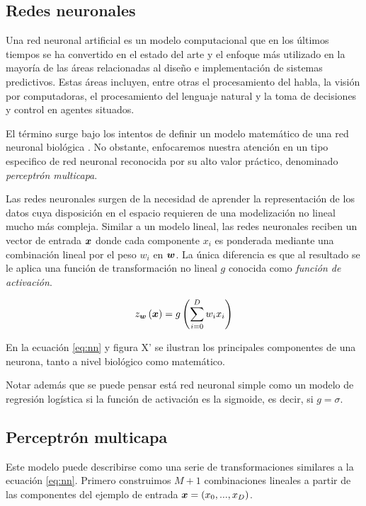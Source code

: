 \subsection{Redes neuronales}

Una red neuronal artificial es un modelo computacional que en los últimos
tiempos se ha convertido en el estado del arte y el enfoque más utilizado en la
mayoría de las áreas relacionadas al diseño e implementación de sistemas
predictivos. Estas áreas incluyen, entre otras el procesamiento del habla, la
visión por computadoras, el procesamiento del lenguaje natural y la toma de
decisiones y control en agentes situados.

El término surge bajo los intentos de definir un modelo matemático de una red
neuronal biológica \citep{McCulloch-Pitts-1990}. No obstante, enfocaremos nuestra atención en un tipo
especifico de red neuronal reconocida por su alto valor práctico, denominado
\emph{perceptrón multicapa}.

Las redes neuronales surgen de la necesidad de aprender la representación de los
datos cuya disposición en el espacio requieren de una modelización no lineal
mucho más compleja. Similar a un modelo lineal, las redes neuronales reciben un
vector de entrada $\boldsymbol{x}$ donde cada componente $x_i$ es ponderada mediante
una combinación lineal por el peso $w_i$ en $\boldsymbol{w}$. La única diferencia es que
al resultado se le aplica una función de transformación no lineal $g$ conocida
como \emph{función de activación}.

\begin{equation} \label{eq:nn}
    z_{\boldsymbol{w}}\left( \boldsymbol{x} \right) = g\left( \sum_{i=0}^{D} w_i x_i \right)
\end{equation}

En la ecuación \ref{eq:nn} y figura X' se ilustran los principales componentes de una
neurona, tanto a nivel biológico como matemático.

Notar además que se puede pensar está red neuronal simple como un modelo de
regresión logística si la función de activación es la sigmoide, es decir, si $g
= \sigma$.

\subsection{Perceptrón multicapa}
\label{subch:multi_layer_perceptron}

Este modelo puede describirse como una serie de transformaciones similares a la
ecuación \ref{eq:nn}. Primero construimos $M + 1$ combinaciones lineales a partir de
las componentes del ejemplo de entrada $\boldsymbol{x} = (x_0, ..., x_D)$.

